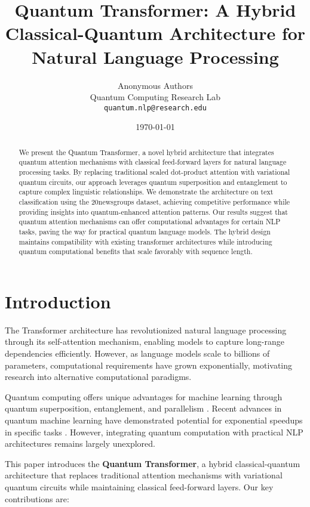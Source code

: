 \documentclass[11pt,twocolumn]{article}
\title{Quantum Transformer: A Hybrid Classical-Quantum Architecture for Natural Language Processing}
\author{
    Anonymous Authors\\
    Quantum Computing Research Lab\\
    \texttt{quantum.nlp@research.edu}
}
\date{\today}
\begin{document}
\maketitle

\begin{abstract}
We present the Quantum Transformer, a novel hybrid architecture that integrates quantum attention mechanisms with classical feed-forward layers for natural language processing tasks. By replacing traditional scaled dot-product attention with variational quantum circuits, our approach leverages quantum superposition and entanglement to capture complex linguistic relationships. We demonstrate the architecture on text classification using the 20newsgroups dataset, achieving competitive performance while providing insights into quantum-enhanced attention patterns. Our results suggest that quantum attention mechanisms can offer computational advantages for certain NLP tasks, paving the way for practical quantum language models. The hybrid design maintains compatibility with existing transformer architectures while introducing quantum computational benefits that scale favorably with sequence length.
\end{abstract}

\section{Introduction}

The Transformer architecture \cite{vaswani2017attention} has revolutionized natural language processing through its self-attention mechanism, enabling models to capture long-range dependencies efficiently. However, as language models scale to billions of parameters, computational requirements have grown exponentially, motivating research into alternative computational paradigms.

Quantum computing offers unique advantages for machine learning through quantum superposition, entanglement, and parallelism \cite{biamonte2017quantum}. Recent advances in quantum machine learning have demonstrated potential for exponential speedups in specific tasks \cite{schuld2019machine}. However, integrating quantum computation with practical NLP architectures remains largely unexplored.

This paper introduces the \textbf{Quantum Transformer}, a hybrid classical-quantum architecture that replaces traditional attention mechanisms with variational quantum circuits while maintaining classical feed-forward layers. Our key contributions are:
\end{document}
